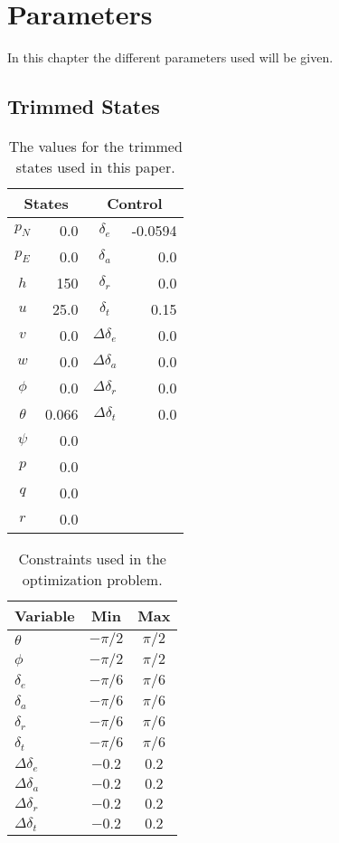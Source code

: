 \chapter{Parameters}

In this chapter the different parameters used will be given.


\section{Trimmed States}

\begin{table}[h]
\centering
\begin{tabular}{|c r | c r|}
    \hline
    \multicolumn{2}{|c|}{States} & \multicolumn{2}{|c|}{Control} \\
    \hline
    $p_N$ & 0.0      & $\delta_e$ & -0.0594 \\
    $p_E$ & 0.0      & $\delta_a$ & 0.0 \\
    $h$ & 150        & $\delta_r$ & 0.0 \\
    $u$ & 25.0       & $\delta_t$ & 0.15 \\
    $v$ & 0.0        & $\Delta \delta_e$ & 0.0 \\
    $w$ & 0.0        & $\Delta \delta_a$ & 0.0 \\
    $\phi$ & 0.0     & $\Delta \delta_r$ & 0.0 \\
    $\theta$ & 0.066 & $\Delta \delta_t$ & 0.0 \\
    $\psi$ & 0.0     & & \\
    $p$ & 0.0        & & \\
    $q$ & 0.0        & & \\
    $r$ & 0.0        & & \\
    \hline
\end{tabular}
\caption{The values for the trimmed states used in this paper.}
\label{tab:trim_states}
\end{table}

\begin{table}
\centering
\begin{tabular}{| l c c |}
    \hline
    Variable & Min & Max \\
    \hline
    $\theta$ & $-\pi/2$ & $\pi/2$\\
    $\phi$ & $-\pi/2$ & $\pi/2$\\
    $\delta_e$ & $-\pi/6$ & $\pi/6$\\
    $\delta_a$ & $-\pi/6$ & $\pi/6$\\
    $\delta_r$ & $-\pi/6$ & $\pi/6$\\
    $\delta_t$ & $-\pi/6$ & $\pi/6$\\
    $\Delta \delta_e$ & $-0.2$ & $0.2$\\
    $\Delta \delta_a$ & $-0.2$ & $0.2$\\
    $\Delta \delta_r$ & $-0.2$ & $0.2$\\
    $\Delta \delta_t$ & $-0.2$ & $0.2$\\
    \hline
\end{tabular}
\caption{Constraints used in the optimization problem.}
\label{tab:constraints}
\end{table}

